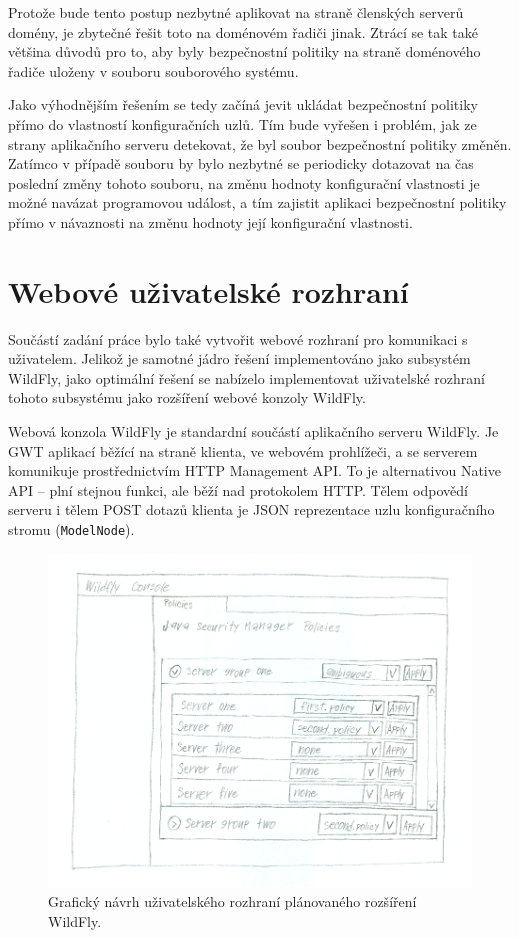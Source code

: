 Protože bude tento postup nezbytné aplikovat na straně členských serverů domény, je zbytečné řešit toto na doménovém řadiči jinak. Ztrácí se tak také většina důvodů pro to, aby byly bezpečnostní politiky na straně doménového řadiče uloženy v souboru souborového systému.

Jako výhodnějším řešením se tedy začíná jevit ukládat bezpečnostní politiky přímo do vlastností konfiguračních uzlů. Tím bude vyřešen i problém, jak ze strany aplikačního serveru detekovat, že byl soubor bezpečnostní politiky změněn. Zatímco v případě souboru by bylo nezbytné se periodicky dotazovat na čas poslední změny tohoto souboru, na změnu hodnoty konfigurační vlastnosti je možné navázat programovou událost, a tím zajistit aplikaci bezpečnostní politiky přímo v návaznosti na změnu hodnoty její konfigurační vlastnosti.

\section{Webové uživatelské rozhraní} \label{navrhGUI}

Součástí zadání práce bylo také vytvořit webové rozhraní pro komunikaci s uživatelem. Jelikož je samotné jádro řešení implementováno jako subsystém WildFly, jako optimální řešení se nabízelo implementovat uživatelské rozhraní tohoto subsystému jako rozšíření webové konzoly WildFly.

Webová konzola WildFly je standardní součástí aplikačního serveru WildFly. Je GWT aplikací běžící na straně klienta, ve webovém prohlížeči, a se serverem komunikuje prostřednictvím HTTP Management API. To je alternativou Native API -- plní stejnou funkci, ale běží nad protokolem HTTP. Tělem odpovědí serveru i tělem POST dotazů klienta je JSON reprezentace uzlu konfiguračního stromu ({\tt ModelNode}). \cite{WildFlyManagementAPIreference}

\begin{figure}[ht]
  \centering
  \includegraphics[width=14cm]{fig/mockup}
  \caption{Grafický návrh uživatelského rozhraní plánovaného rozšíření WildFly.}
\end{figure}

